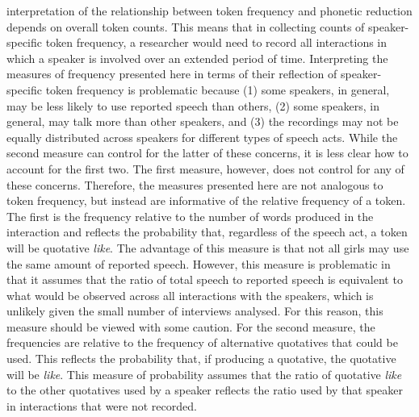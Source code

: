  interpretation of the relationship between token frequency and phonetic reduction depends on overall token counts. This means that in collecting counts of speaker-specific token frequency, a researcher would need to record all interactions in which a speaker is involved over an extended period of time. Interpreting the measures of frequency presented here in terms of their reflection of speaker-specific token frequency is problematic because (1) some speakers, in general, may be less likely to use reported speech than others, (2) some speakers, in general, may talk more than other speakers, and (3) the recordings may not be equally distributed across speakers for different types of speech acts. While the second measure can control for the latter of these concerns, it is less clear how to account for the first two. The first measure, however, does not control for any of these concerns. Therefore, the measures presented here are not analogous to token frequency, but instead are informative of the relative frequency of a token. The first is the frequency relative to the number of words produced in the interaction and reflects the probability that, regardless of the speech act, a token will be quotative \textit{like}. The advantage of this measure is that not all girls may use the same amount of reported speech. However, this measure is problematic in that it assumes that the ratio of total speech to reported speech is equivalent to what would be observed across all interactions with the speakers, which is unlikely given the small number of interviews analysed. For this reason, this measure should be viewed with some caution. For the second measure, the frequencies are relative to the frequency of alternative quotatives that could be used. This reflects the probability that, if producing a quotative, the quotative will be \textit{like}. This measure of probability assumes that the ratio of quotative \textit{like} to the other quotatives used by a speaker reflects the ratio used by that speaker in interactions that were not recorded.

\nocite{bybee2002}



